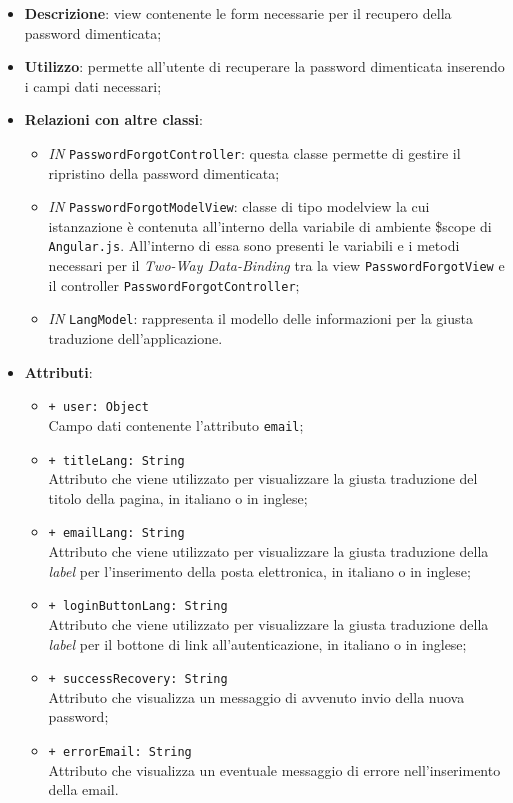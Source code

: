 \begin{itemize}
	\item \textbf{Descrizione}: view contenente le form necessarie per il recupero della password dimenticata;
	\item \textbf{Utilizzo}: permette all'utente di recuperare la password dimenticata inserendo i campi dati necessari;
	\item \textbf{Relazioni con altre classi}:
	\begin{itemize}
			\item \textit{IN} \texttt{PasswordForgotController}: questa classe permette di gestire il ripristino della password dimenticata;
			\item \textit{IN} \texttt{PasswordForgotModelView}: classe di tipo modelview la cui istanzazione è contenuta all'interno della variabile di ambiente \$scope di \texttt{Angular.js}. All'interno di essa sono presenti le variabili e i metodi necessari per il \textit{Two-Way Data-Binding} tra la view \texttt{PasswordForgotView} e il controller \texttt{PasswordForgotController};
			\item \textit{IN} \texttt{LangModel}: rappresenta il modello delle informazioni per la giusta traduzione dell'applicazione.
	\end{itemize}
	\item \textbf{Attributi}:
	\begin{itemize}
		\item \texttt{+ user: Object} \\ Campo dati contenente l'attributo \texttt{email};
		\item \texttt{+ titleLang: String} \\ Attributo che viene utilizzato per visualizzare la giusta traduzione del titolo della pagina, in italiano o in inglese;
		\item \texttt{+ emailLang: String} \\ Attributo che viene utilizzato per visualizzare la giusta traduzione della \textit{label} per l'inserimento della posta elettronica, in italiano o in inglese;
		\item \texttt{+ loginButtonLang: String} \\ Attributo che viene utilizzato per visualizzare la giusta traduzione della \textit{label} per il bottone di link all'autenticazione, in italiano o in inglese;
		\item \texttt{+ successRecovery: String} \\ Attributo che visualizza un messaggio di avvenuto invio della nuova password;
		\item \texttt{+ errorEmail: String} \\ Attributo che visualizza un eventuale messaggio di errore nell'inserimento della email.
	\end{itemize}
\end{itemize}


